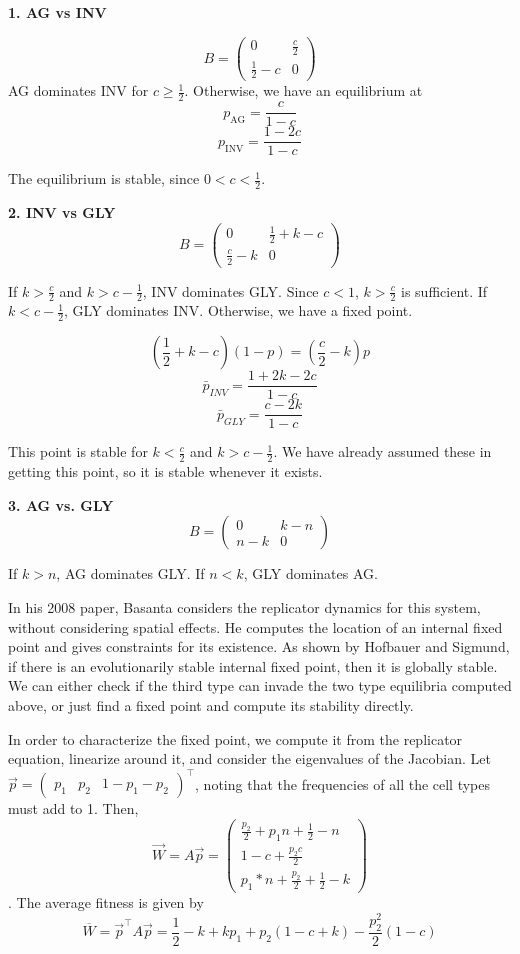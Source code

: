 \documentclass[12pt]{report}
\begin{document}
\textbf{1. AG vs INV} 

$$B = \begin{pmatrix}
0 & \frac{c}{2}\\
\frac{1}{2} - c & 0 
\end{pmatrix} $$
AG dominates INV for $c \ge \frac{1}{2}$. Otherwise, we have an equilibrium at 
$$p_{\text{AG}} = \frac{c}{1-c}$$
$$p_{\text{INV}} = \frac{1 - 2c}{1-c}$$

The equilibrium is stable, since $0 < c < \frac{1}{2}$. 

\textbf{2. INV vs GLY}
$$B = \begin{pmatrix}
0 & \frac{1}{2} + k - c\\
\frac{c}{2} - k & 0 
\end{pmatrix} $$

If $k > \frac{c}{2}$ and $k > c - \frac{1}{2}$, INV dominates GLY. Since $c < 1$, $k > \frac{c}{2}$ is sufficient. If $k  < c - \frac{1}{2}$, GLY dominates INV. Otherwise, we have a fixed point.  

$$(\frac{1}{2} + k - c) (1 - p) = (\frac{c}{2} - k) p$$
$$\bar{p}_{INV} = \frac{1 + 2k - 2c}{1 - c}$$
$$\bar{p}_{GLY} = \frac{c - 2k}{1-c}$$

This point is stable for $k < \frac{c}{2}$ and $k > c - \frac{1}{2}$. We have already assumed these in getting this point, so it is stable whenever it exists.
 
 \textbf{3. AG vs. GLY}
$$B = \begin{pmatrix}
0 & k -n\\
n -k & 0 
\end{pmatrix} $$

If $k > n$, AG dominates GLY. If $n < k$, GLY dominates AG. 

In his 2008 paper, Basanta considers the replicator dynamics for this system, without considering spatial effects. He computes the location of an internal fixed point and gives constraints for its existence. As shown by Hofbauer and Sigmund, if there is an evolutionarily stable internal fixed point, then it is globally stable. We can either check if the third type can invade the two type equilibria computed above, or just find a fixed point and compute its stability directly.

In order to characterize the fixed point, we compute it from the replicator equation, linearize around it, and consider the eigenvalues of the Jacobian.
Let $\vec{p} = { \begin{pmatrix} p_1 & p_2 & 1-p_1-p_2 \end{pmatrix}}^\top$, noting that the frequencies of all the cell types must add to 1. Then, $$\vec{W} = A\vec{p} = 
{\begin{pmatrix} \frac{p_2}{2} + p_1 n + \frac{1}{2}-n\\
1-c + \frac{p_2 c}{2}\\ %
p_1*n+\frac{p_2}{2} + \frac{1}{2}-k \end{pmatrix}}$$. The average fitness is given by  $$\overline{W} = \vec{p}^\top A \vec{p} = \frac{1}{2}-k+ k p_1 + p_2 (1 - c + k) - \frac{p_2^2}{2} (1-c) $$
\end{document}
